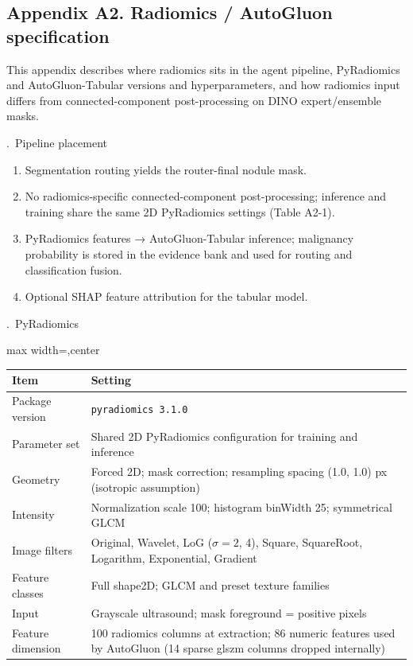 \subsection*{Appendix A2. Radiomics / AutoGluon specification}
\label{app:A2}
\begin{responseappendixprose}
\noindent This appendix describes where radiomics sits in the agent pipeline, PyRadiomics and AutoGluon-Tabular versions and hyperparameters, and how radiomics input differs from connected-component post-processing on DINO expert/ensemble masks.
\par
{}.~Pipeline placement
\begin{enumerate}[leftmargin=1.6em,topsep=0.2em,itemsep=0.15em]
\item Segmentation routing yields the router-final nodule mask.
\item No radiomics-specific connected-component post-processing; inference and training share the same 2D PyRadiomics settings (Table A2-1).
\item PyRadiomics features → AutoGluon-Tabular inference; malignancy probability is stored in the evidence bank and used for routing and classification fusion.
\item Optional SHAP feature attribution for the tabular model.
\end{enumerate}
.~PyRadiomics
\par
\begin{responseinlinetable}
\label{tab:A2-pyradiomics}
\begin{adjustbox}{max width=\textwidth,center}
\begin{tabular}{ll}
\toprule
Item & Setting \\
\midrule
Package version & \texttt{pyradiomics 3.1.0} \\
Parameter set & Shared 2D PyRadiomics configuration for training and inference \\
Geometry & Forced 2D; mask correction; resampling spacing (1.0, 1.0) px (isotropic assumption) \\
Intensity & Normalization scale 100; histogram binWidth 25; symmetrical GLCM \\
Image filters & Original, Wavelet, LoG ($\sigma=2$, 4), Square, SquareRoot, Logarithm, Exponential, Gradient \\
Feature classes & Full shape2D; GLCM and preset texture families \\
Input & Grayscale ultrasound; mask foreground = positive pixels \\
Feature dimension & 100 radiomics columns at extraction; 86 numeric features used by AutoGluon (14 sparse glszm columns dropped internally) \\
\bottomrule
\end{tabular}
\end{adjustbox}
\end{responseinlinetable}


\end{responseappendixprose}
